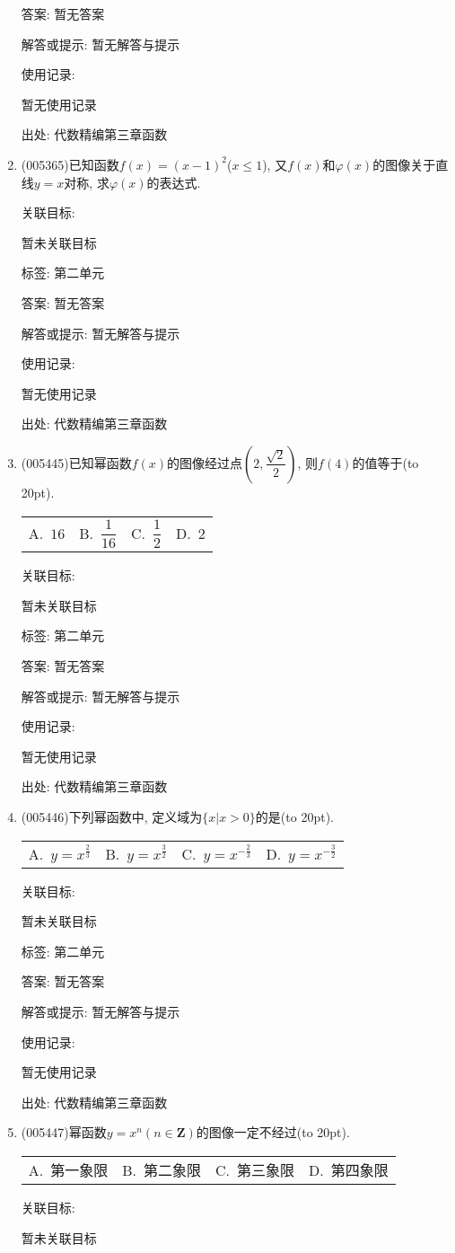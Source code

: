 \documentclass[10pt,a4paper]{article}
\newcommand{\bracket}[1]{(\hbox to #1pt{})}
\newcommand{\fourch}[4]{\par\begin{tabular}{p{.23\textwidth}p{.23\textwidth}p{.23\textwidth}p{.23\textwidth}}
A.~#1 &B.~#2& C.~#3& D.~#4
\end{tabular}}
\begin{document}
\begin{enumerate}[1.]
答案: 暂无答案

解答或提示: 暂无解答与提示

使用记录:

暂无使用记录


出处: 代数精编第三章函数
\item { (005365)}已知函数$f(x)=(x-1)^2$($x\le 1$), 又$f(x)$和$\varphi (x)$的图像关于直线$y=x$对称, 求$\varphi (x)$的表达式.


关联目标:

暂未关联目标



标签: 第二单元

答案: 暂无答案

解答或提示: 暂无解答与提示

使用记录:

暂无使用记录


出处: 代数精编第三章函数
\item { (005445)}已知幂函数$f(x)$的图像经过点$(2,\dfrac{\sqrt 2}2)$, 则$f(4)$的值等于\bracket{20}.
\fourch{$16$}{$\dfrac 1{16}$}{$\dfrac 12$}{$2$}


关联目标:

暂未关联目标



标签: 第二单元

答案: 暂无答案

解答或提示: 暂无解答与提示

使用记录:

暂无使用记录


出处: 代数精编第三章函数
\item { (005446)}下列幂函数中, 定义域为$\{x|x>0\}$的是\bracket{20}.
\fourch{$y=x^{\frac 23}$}{$y=x^{\frac 32}$}{$y=x^{-\frac 23}$}{$y=x^{-\frac 32}$}


关联目标:

暂未关联目标



标签: 第二单元

答案: 暂无答案

解答或提示: 暂无解答与提示

使用记录:

暂无使用记录


出处: 代数精编第三章函数
\item { (005447)}幂函数$y=x^n(n\in \mathbf{Z})$的图像一定不经过\bracket{20}.
\fourch{第一象限}{第二象限}{第三象限}{第四象限}


关联目标:

暂未关联目标




\end{enumerate}
\end{document}
